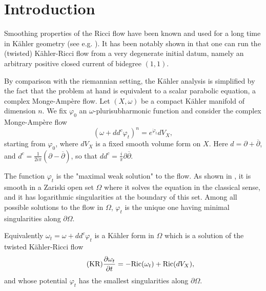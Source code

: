 \documentclass[11pt]{amsart}
\numberwithin{equation}{section}
\newcommand{\f}{\varphi}
\begin{document}
 
\setcounter{tocdepth}{1}
\tableofcontents



\section*{Introduction}

Smoothing properties of the Ricci flow have been known and used for a long time in K\"ahler geometry
(see e.g. \cite{BM87,Tian97,PSSW08,SzTo11,ST17}). It has been notably shown in \cite{GZ17,DNL17}
that one can run the (twisted) K\"ahler-Ricci flow from a very degenerate initial datum, 
namely an arbitrary positive  closed current of bidegree $(1,1)$.

By comparison with the riemannian setting, the K\"ahler analysis is simplified by the fact that
the problem at hand is equivalent to a scalar parabolic equation, a complex Monge-Amp\`ere flow.
Let $(X,\omega)$ be a compact K\"ahler manifold of dimension $n$.
We fix $\f_0$ an $\omega$-plurisubharmonic function and
consider the complex Monge-Ampère flow 
\[
(\omega+dd^c \varphi_t)^n = e^{\dot \varphi_t}dV_X,
\]
starting from $\f_0$, where $dV_X$ is a fixed smooth volume form on $X$.
Here  $d=\partial+\overline{\partial}$, and $d^c=\frac{1}{2i \pi} (\partial-\overline{\partial})$,
so that $dd^c =\frac{i}{ \pi} \partial\overline{\partial}$.

\smallskip

The function $\varphi_t$ is the "maximal weak solution" to the flow.
As shown in \cite{GZ17,DNL17}, it is smooth in a Zariski open set $\Omega$ where it solves the equation in the classical sense,
and it has logarithmic singularities at the boundary of this set.
Among all possible solutions to the flow in $\Omega$, $\f_t$ is the unique one having minimal singularities
along $\partial \Omega$.

Equivalently $\omega_t=\omega+dd^c \f_t$ is a K\"ahler form in $\Omega$
which is a solution of the twisted K\"ahler-Ricci flow
\begin{equation*} \label{eq:KR}
\tag{KR}
\frac{\partial \omega_t}{\partial t}=-{\rm Ric}(\omega_t)+{\rm Ric}(dV_X),
\end{equation*}
and whose potential $\f_t$ has the smallest singularities along $\partial \Omega$.
\end{document}
